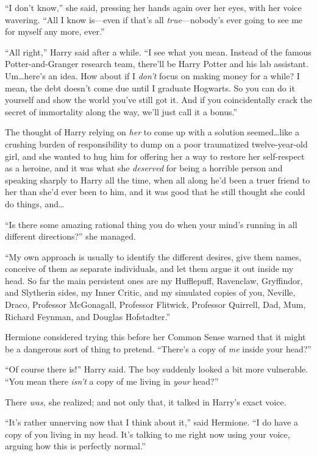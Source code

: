 “I don’t know,” she said, pressing her hands again over her eyes, with her voice wavering. “All I know is—even if that’s all \emph{true}—nobody’s ever going to see me for myself any more, ever.”

“All right,” Harry said after a while. “I see what you mean. Instead of the famous Potter-and-Granger research team, there’ll be Harry Potter and his lab assistant. Um…here’s an idea. How about if I \emph{don’t} focus on making money for a while? I mean, the debt doesn’t come due until I graduate Hogwarts. So you can do it yourself and show the world you’ve still got it. And if you coincidentally crack the secret of immortality along the way, we’ll just call it a bonus.”

The thought of Harry relying on \emph{her} to come up with a solution seemed…like a crushing burden of responsibility to dump on a poor traumatized twelve-year-old girl, and she wanted to hug him for offering her a way to restore her self-respect as a heroine, and it was what she \emph{deserved} for being a horrible person and speaking sharply to Harry all the time, when all along he’d been a truer friend to her than she’d ever been to him, and it was good that he still thought she could do things, and…

“Is there some amazing rational thing you do when your mind’s running in all different directions?” she managed.

“My own approach is usually to identify the different desires, give them names, conceive of them as separate individuals, and let them argue it out inside my head. So far the main persistent ones are my Hufflepuff, Ravenclaw, Gryffindor, and Slytherin sides, my Inner Critic, and my simulated copies of you, Neville, Draco, Professor McGonagall, Professor Flitwick, Professor Quirrell, Dad, Mum, Richard Feynman, and Douglas Hofstadter.”

Hermione considered trying this before her Common Sense warned that it might be a dangerous sort of thing to pretend. “There’s a copy of \emph{me} inside your head?”

“Of course there is!” Harry said. The boy suddenly looked a bit more vulnerable. “You mean there \emph{isn’t} a copy of me living in \emph{your} head?”

There \emph{was,} she realized; and not only that, it talked in Harry’s exact voice.

“It’s rather unnerving now that I think about it,” said Hermione. “I do have a copy of you living in my head. It’s talking to me right now using your voice, arguing how this is perfectly normal.”


